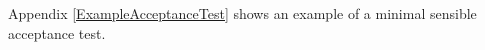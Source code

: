 \documentclass{l4proj}
\newcommand\genericstyle{\lstset{basicstyle=\ttm}}
\newcommand\codeinline[1]{{\genericstyle\lstinline!#1!}}
\newcommand\pythonstyle{\lstset{
language=Python,
basicstyle=\ttm,
otherkeywords={self},
keywordstyle=\ttb\color{keyword},
emph={__init__,ThingDoer,accept_foo_bar,THING_QUOTA,do_thing,Discombobulator,discombobulate,
Discombobulated,func},
emphstyle=\ttb\color{name},
stringstyle=\color{PineGreen},
rulecolor=\color{gray},
showstringspaces=false
}}
\newcommand\pythoninline[1]{{\pythonstyle\lstinline!#1!}}
\begin{document}
Appendix \ref{ExampleAcceptanceTest} shows an example of a minimal
sensible acceptance test.







\end{document}
